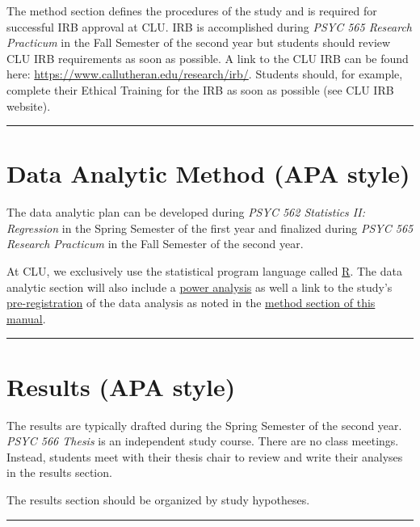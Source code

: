 \documentclass[openany]{book}
\begin{document}
The method section defines the procedures of the study and is required for successful IRB approval at CLU. IRB is accomplished during \emph{PSYC 565 Research Practicum} in the Fall Semester of the second year but students should review CLU IRB requirements as soon as possible. A link to the CLU IRB can be found here: \url{https://www.callutheran.edu/research/irb/}. Students should, for example, complete their Ethical Training for the IRB as soon as possible (see CLU IRB website).

\begin{center}\rule{0.5\linewidth}{0.5pt}\end{center}

\hypertarget{data-analytic-method-apa-style}{%
\section{Data Analytic Method (APA style)}\label{data-analytic-method-apa-style}}

The data analytic plan can be developed during \emph{PSYC 562 Statistics II: Regression} in the Spring Semester of the first year and finalized during \emph{PSYC 565 Research Practicum} in the Fall Semester of the second year.

At CLU, we exclusively use the statistical program language called \href{https://www.r-project.org/}{R}. The data analytic section will also include a \protect\hyperlink{method}{power analysis} as well a link to the study's \href{https://aspredicted.org/}{pre-registration} of the data analysis as noted in the \protect\hyperlink{method}{method section of this manual}.

\begin{center}\rule{0.5\linewidth}{0.5pt}\end{center}

\hypertarget{results-apa-style}{%
\section{Results (APA style)}\label{results-apa-style}}

The results are typically drafted during the Spring Semester of the second year. \emph{PSYC 566 Thesis} is an independent study course. There are no class meetings. Instead, students meet with their thesis chair to review and write their analyses in the results section.

The results section should be organized by study hypotheses.

\begin{center}\rule{0.5\linewidth}{0.5pt}\end{center}
\end{document}

